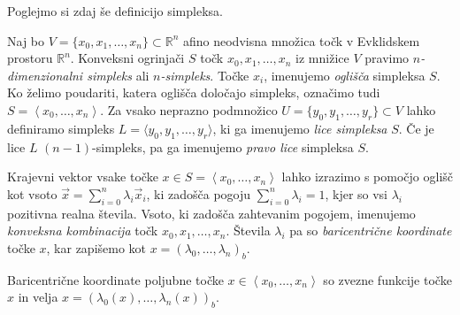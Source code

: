 \documentclass[mat1]{fmfdelo}
\newcommand{\R}{\mathbb R}
\newcommand{\0}{\underline{0}}
\begin{document}
Poglejmo si zdaj še definicijo simpleksa.
\begin{definicija}
Naj bo $V = \{x_0, x_1, \dots , x_n \} \subset \R^n$ afino neodvisna množica točk v Evklidskem prostoru $\R^n$. Konveksni ogrinjači $S$ točk $x_0, x_1, \dots , x_n$ iz mnižice $V$ pravimo \emph{$n$-dimenzionalni simpleks} ali \emph{$n$-simpleks}. Točke $x_i$, imenujemo \emph{oglišča} simpleksa $S$. Ko želimo poudariti, katera oglišča določajo simpleks, označimo tudi $S = \left < x_0, \dots, x_n \right >$. Za vsako neprazno podmnožico $U = \{ y_0, y_1, \dots, y_r \} \subset V$ lahko definiramo simpleks $L = \langle y_0, y_1, \dots, y_r \rangle$, ki ga imenujemo \emph{lice simpleksa} $S$. Če je lice $L$ $(n-1)$-simpleks, pa ga imenujemo \emph{pravo lice} simpleksa $S$. 
\end{definicija}
 Krajevni vektor vsake točke $x \in S = \left < x_0, \dots, x_n \right >$ lahko izrazimo s pomočjo oglišč kot vsoto $\vec{x} = \sum\limits_{i=0}^n \lambda_i \vec{x}_i$, ki zadošča pogoju $\sum\limits_{i=0}^n \lambda_i = 1$, kjer so vsi $\lambda_i$ pozitivna realna števila. Vsoto, ki zadošča zahtevanim pogojem, imenujemo \emph{konveksna kombinacija} točk $x_0, x_1, \dots , x_n$. Števila $\lambda_i$ pa so \emph{baricentrične koordinate} točke $x$, kar zapišemo kot $x = (\lambda_0, \dots, \lambda_n)_b$.
\begin{trditev}\label{trd:zveznost-baricentra}
Baricentrične koordinate poljubne točke $x \in \left <x_0, \dots, x_n \right >$ so zvezne funkcije točke $x$ in velja $x = (\lambda_0(x), \dots, \lambda_n(x))_b$.
\end{trditev}
\end{document}
